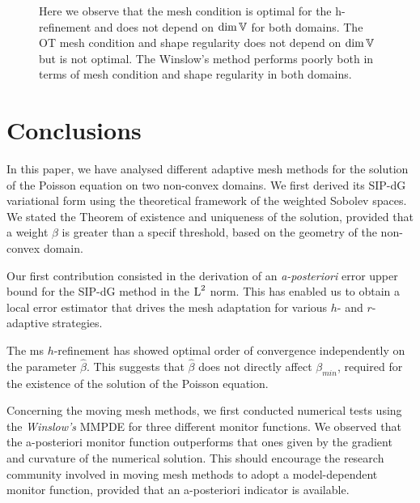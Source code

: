 \documentclass[a4paper,11pt]{article}
\begin{document}
\begin{figure}[h!]
{}
\caption{Here we observe that the mesh condition is optimal for the h-refinement and  does not depend on $\dim \mathbb V$ for both domains. The OT mesh condition and shape regularity does not depend on $\dim \mathbb V$ but is not optimal. The Winslow's method performs poorly both in terms of mesh condition and shape regularity in both domains.}
\end{figure}


\clearpage
\newpage

\section{Conclusions}
\label{sec:conclusion}

In this paper, we have analysed different adaptive mesh methods for the solution of the Poisson equation on two non-convex domains. We first derived its SIP-dG variational form using the theoretical framework of the weighted Sobolev spaces. We stated the Theorem of existence and uniqueness of the solution, provided that a weight $\beta$ is greater than a specif threshold, based on the geometry of the non-convex domain. 

Our first contribution consisted in the derivation of an \textit{a-posteriori} error upper bound for the SIP-dG method in the $\operatorname L^{2}$ norm. This has enabled us to obtain a local error estimator that drives the mesh adaptation for various $h$- and $r$-adaptive strategies. 

The ms $h$-refinement has showed optimal order of convergence independently on the parameter $\hat{\beta}$. This suggests that $\hat{\beta}$ does not directly affect $\beta_{min}$, required for the existence of the solution of the Poisson equation.

Concerning the moving mesh methods, we first conducted numerical tests using the \textit{Winslow's} MMPDE for three different monitor functions. We observed that the a-posteriori monitor function outperforms that ones given by the gradient and curvature of the numerical solution. This should encourage the research community involved in moving mesh methods to adopt a model-dependent monitor function, provided that an a-posteriori indicator is available. 
\end{document}
